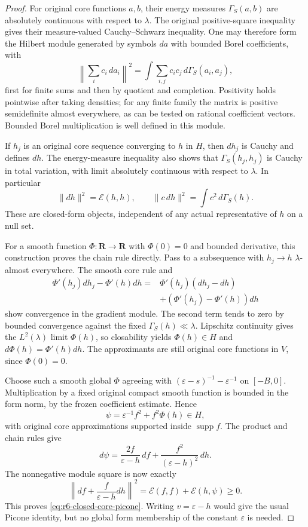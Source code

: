 \documentclass[11pt,a4paper]{article}
\numberwithin{equation}{section}
\theoremstyle{definition}
\theoremstyle{remark}
\begin{document}
\begin{proof}
For original core functions $a,b$, their energy measures
$\Gamma_S(a,b)$ are absolutely continuous with respect to $\lambda$.
The original positive-square inequality gives their measure-valued
Cauchy--Schwarz inequality. One may therefore form the Hilbert module
generated by symbols $da$ with bounded Borel coefficients, with
\[
 \left\|\sum_i c_i\,da_i\right\|^2
       =\int\sum_{i,j}c_ic_j\,d\Gamma_S(a_i,a_j),
\]
first for finite sums and then by quotient and completion. Positivity
holds pointwise after taking densities; for any finite family the
matrix is positive semidefinite almost everywhere, as can be tested
on rational coefficient vectors. Bounded Borel multiplication is
well defined in this module.

If $h_j$ is an original core sequence converging to $h$ in $H$, then
$dh_j$ is Cauchy and defines $dh$. The energy-measure inequality also
shows that $\Gamma_S(h_j,h_j)$ is Cauchy in total variation, with
limit absolutely continuous with respect to $\lambda$. In particular
\[
                 \|dh\|^2=\mathcal E(h,h),
           \qquad \|c\,dh\|^2=\int c^2\,d\Gamma_S(h).
\]
These are closed-form objects, independent of any actual representative
of $h$ on a null set.

For a smooth function $\Phi:\mathbf R\to\mathbf R$ with
$\Phi(0)=0$ and bounded derivative, this construction proves the
chain rule directly. Pass to a subsequence with $h_j\to h$
$\lambda$-almost everywhere. The smooth core rule and
\[
 \begin{split}
 \Phi'(h_j)dh_j-\Phi'(h)dh
   ={}&\Phi'(h_j)(dh_j-dh)\\
      &+(\Phi'(h_j)-\Phi'(h))dh
 \end{split}
\]
show convergence in the gradient module. The second term tends to
zero by bounded convergence against the fixed
$\Gamma_S(h)\ll\lambda$. Lipschitz continuity gives the $L^2(\lambda)$
limit $\Phi(h)$, so closability yields
$\Phi(h)\in H$ and $d\Phi(h)=\Phi'(h)dh$. The approximants are still
original core functions in $V$, since $\Phi(0)=0$.

Choose such a smooth global $\Phi$ agreeing with
$(\varepsilon-s)^{-1}-\varepsilon^{-1}$ on $[-B,0]$.
Multiplication by a fixed original compact smooth function is bounded
in the form norm, by the frozen coefficient estimate. Hence
\[
           \psi=\varepsilon^{-1}f^2+f^2\Phi(h)\in H,
\]
with original core approximations supported inside
$\operatorname{supp}f$. The product and chain rules give
\[
            d\psi=\frac{2f}{\varepsilon-h}\,df
                       +\frac{f^2}{(\varepsilon-h)^2}\,dh.
\]
The nonnegative module square is now exactly
\[
 \left\|df+\frac{f}{\varepsilon-h}dh\right\|^2
      =\mathcal E(f,f)+\mathcal E(h,\psi)\ge0.
\]
This proves \eqref{eq:r6-closed-core-picone}. Writing
$v=\varepsilon-h$ would give the usual Picone identity, but no
global form membership of the constant $\varepsilon$ is needed.
\end{proof}
\end{document}
